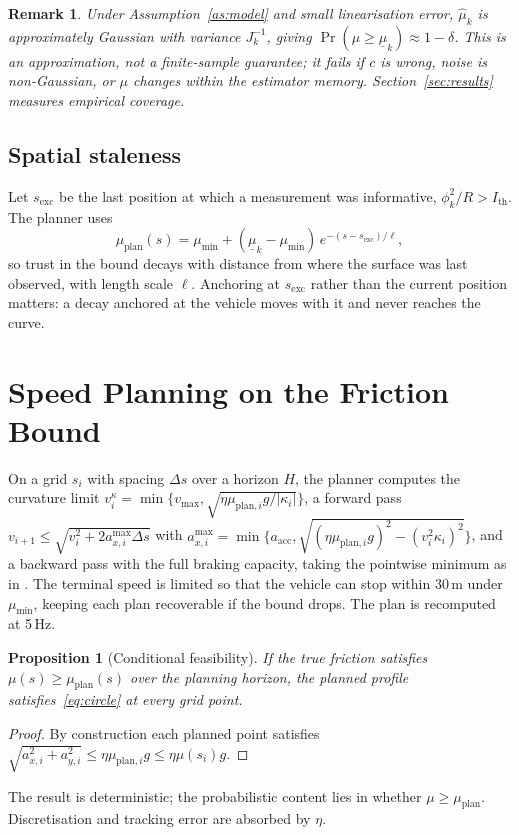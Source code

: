 \documentclass[letterpaper,journal,twoside]{IEEEtran}%
\newtheorem{proposition}{Proposition}
\newtheorem{remark}{Remark}
\newcommand{\mulb}{\underline{\mu}}
\begin{document}
\begin{remark}
Under Assumption~\ref{as:model} and small linearisation error, $\hat\mu_k$ is approximately Gaussian with variance $J_k^{-1}$, giving $\Pr(\mu\ge\mulb_k)\approx1-\delta$. This is an approximation, not a finite-sample guarantee; it fails if $c$ is wrong, noise is non-Gaussian, or $\mu$ changes within the estimator memory. Section~\ref{sec:results} measures empirical coverage.
\end{remark}

\subsection{Spatial staleness}
Let $s_{\mathrm{exc}}$ be the last position at which a measurement was informative, $\phi_k^2/R>I_{\mathrm{th}}$. The planner uses
\begin{equation}
\mu_{\mathrm{plan}}(s)=\mu_{\min}+(\mulb_k-\mu_{\min})\,e^{-(s-s_{\mathrm{exc}})/\ell}, \label{eq:decay}
\end{equation}
so trust in the bound decays with distance from where the surface was last observed, with length scale $\ell$. Anchoring at $s_{\mathrm{exc}}$ rather than the current position matters: a decay anchored at the vehicle moves with it and never reaches the curve.

\section{Speed Planning on the Friction Bound}
On a grid $s_i$ with spacing $\Delta s$ over a horizon $H$, the planner computes the curvature limit $v_i^{\kappa}=\min\{v_{\max},\sqrt{\eta\mu_{\mathrm{plan},i}g/|\kappa_i|}\}$, a forward pass $v_{i+1}\le\sqrt{v_i^2+2a_{x,i}^{\max}\Delta s}$ with $a_{x,i}^{\max}=\min\{a_{\mathrm{acc}},\sqrt{(\eta\mu_{\mathrm{plan},i}g)^2-(v_i^2\kappa_i)^2}\}$, and a backward pass with the full braking capacity, taking the pointwise minimum as in \cite{kapania2016}. The terminal speed is limited so that the vehicle can stop within 30\,m under $\mu_{\min}$, keeping each plan recoverable if the bound drops. The plan is recomputed at 5\,Hz.

\begin{proposition}[Conditional feasibility]\label{prop:feas}
If the true friction satisfies $\mu(s)\ge\mu_{\mathrm{plan}}(s)$ over the planning horizon, the planned profile satisfies~\eqref{eq:circle} at every grid point.
\end{proposition}
\begin{proof}
By construction each planned point satisfies $\sqrt{a_{x,i}^2+a_{y,i}^2}\le\eta\mu_{\mathrm{plan},i}g\le\eta\mu(s_i)g$.
\end{proof}
The result is deterministic; the probabilistic content lies in whether $\mu\ge\mu_{\mathrm{plan}}$. Discretisation and tracking error are absorbed by $\eta$.
\end{document}
